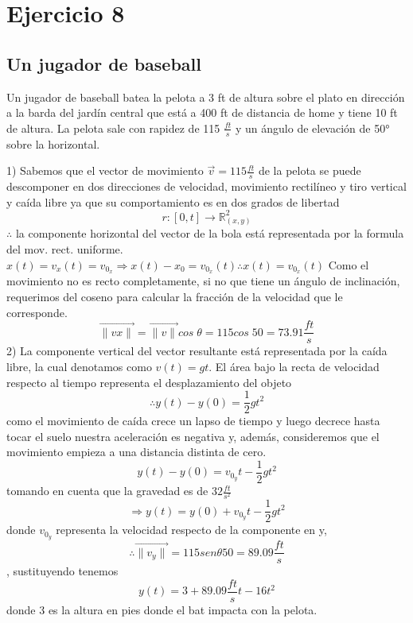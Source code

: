 \chapter*{Ejercicio 8}
\section*{Un jugador de baseball}
    Un jugador de baseball batea la pelota a 3 ft de altura sobre el plato en dirección a la barda del jardín central que está a 400 ft de distancia de home y tiene 10 ft de altura. La pelota sale con rapidez de 115 $\frac{ft}{s}$ y un ángulo de elevación de 50° sobre la horizontal.
    
    1) Sabemos que el vector de movimiento $\vec{v}=115\frac{ft}{s}$ de la pelota se puede descomponer en dos direcciones de velocidad, movimiento rectilíneo y tiro vertical y caída libre ya que su comportamiento es en dos grados de libertad $$r:\left[0,t\right]\rightarrow \mathbb{R}^2_{(x,y)}$$
    $\therefore$ la componente horizontal del  vector de la bola está representada por la formula del mov. rect. uniforme.$x(t)=v_x(t)=v_{0_x}\Rightarrow x(t)-x_{0}=v_{0_x}(t)\therefore x(t)=v_{0_x}(t)$
    Como el movimiento no es recto completamente, si no que tiene un ángulo de inclinación, requerimos del coseno para calcular la fracción de la velocidad que le corresponde. $$\vec{\|vx\|}=\vec{\|v\|}cos\;\theta = 115cos\;50 = 73.91\frac{ft}{s}$$
    2) La componente vertical del vector resultante está representada por la caída libre, la cual denotamos como $v(t)=gt$.
    El área bajo la recta de velocidad respecto al tiempo representa el desplazamiento del objeto $$\therefore y(t)-y(0)=\frac{1}{2}gt^2$$
    como el movimiento de caída crece un lapso de tiempo y luego decrece hasta tocar el suelo nuestra aceleración es negativa y, además, consideremos que el movimiento empieza a una distancia distinta de cero.$$y(t)-y(0)=v_{0_y}t-\frac{1}{2}gt^2$$ tomando en cuenta que la gravedad es de $32\frac{ft}{s^2}$ $$\Rightarrow y(t)=y(0)+v_{0_y}t-\frac{1}{2}gt^2$$ donde $v_{0_y}$ representa la velocidad respecto de la componente en y, $$\therefore \vec{\|v_y\|}=115 sen\theta 50=89.09\frac{ft}{s}$$, sustituyendo tenemos$$y(t)=3+89.09\frac{ft}{s}t-16t^2$$ donde 3 es la altura en pies donde el bat impacta con la pelota.
    
    \vspace{5mm} %
    
